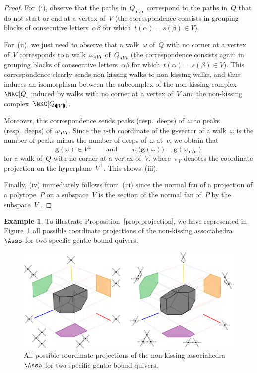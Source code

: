 \documentclass{amsart}
\theoremstyle{definition}
\newtheorem{example}[theorem]{Example}
\renewcommand{\b}[1]{\mathbf{#1}} %
\newcommand{\fref}[1]{Figure~\ref{#1}} %
\newcommand{\blinkers}[1]{_{\LEFTCIRCLE \!\! #1 \!\! \RIGHTCIRCLE}} %
\newcommand{\gvector}[1]{\mathbf{g}(#1)} %
\begin{document}
\begin{proof}%
For~(i), observe that the paths in~$\bar Q\blinkers{V}$ correspond to the paths in~$\bar Q$ that do not start or end at a vertex of~$V$ (the correspondence consists in grouping blocks of consecutive letters~$\alpha\beta$ for which~$t(\alpha) = s(\beta) \in V$).

For~(ii), we just need to observe that a walk~$\omega$ of~$\bar Q$ with no corner at a vertex of~$V$ corresponds to a walk~$\omega\blinkers{V}$ of~$\bar Q\blinkers{V}$ (the correspondence consists again in grouping blocks of consecutive letters~$\alpha\beta$ for which~$t(\alpha) = s(\beta) \in V$).
This correspondence clearly sends non-kissing walks to non-kissing walks, and thus induces an isomorphism between the subcomplex of the non-kissing complex~$\NKC[\bar Q]$ induced by walks with no corner at a vertex of~$V$ and the non-kissing complex~$\NKC[\bar Q\blinkers{V}]$.

Moreover, this correspondence sends peaks (resp.~deeps) of~$\omega$ to peaks (resp.~deeps) of~$\omega\blinkers{V}$.
Since the $v$-th coordinate of the $\b{g}$-vector of a walk~$\omega$ is the number of peaks minus the number of deeps of~$\omega$ at~$v$, we obtain that
\[
\gvector{\omega} \in V^\perp
\qquad\text{and}\qquad
\pi_V \big( \gvector{\omega} \big) = \gvector{\omega\blinkers{V}}
\]
for a walk of~$\bar Q$ with no corner at a vertex of~$V$, where~$\pi_V$ denotes the coordinate projection on the hyperplane~$V^\perp$.
This shows~(iii).

Finally, (iv) immediately follows from~(iii) since the normal fan of a projection of a polytope~$P$ on a subspace~$V$ is the section of the normal fan of~$P$ by the subspace~$V$ \cite[Lemma~7.11]{Ziegler-polytopes}.
\end{proof}

\begin{example}
To illustrate Proposition~\ref{prop:projection}, we have represented in \fref{fig:exmKillVertices} all possible coordinate projections of the non-kissing associahedra~$\Asso$ for two specific gentle bound quivers.

\begin{figure}[t]
	\capstart
	\centerline{\includegraphics[width=1.2\textwidth]{exmKillVertices}}
	\caption{All possible coordinate projections of the non-kissing associahedra~$\Asso$ for two specific gentle bound quivers.}
	\label{fig:exmKillVertices}
\end{figure}
\end{example}
\end{document}
